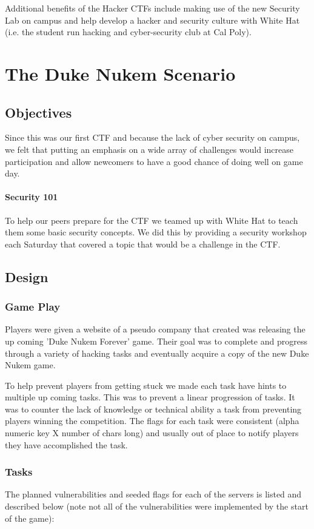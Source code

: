 \documentclass[10pt]{article}
\begin{document}
Additional benefits of the Hacker CTFs include making use of the new Security
Lab on campus and help develop a hacker and security culture with White Hat
(i.e. the student run hacking and cyber-security club at Cal Poly).

\section{The Duke Nukem Scenario}
\subsection{Objectives}
Since this was our first CTF and because the lack of cyber security
on campus, we felt that putting an emphasis on a wide array of challenges
would increase participation and allow newcomers to have a good chance of doing well 
on game day.

\paragraph*{Security 101}To help our peers prepare for the CTF we teamed up with
White Hat to teach them some basic security concepts. We did this by providing a
security workshop each Saturday that covered a topic that would be a challenge
in the CTF.

\subsection{Design}
\subsubsection{Game Play}
Players were given a website of a pseudo company that created was releasing the up coming
'Duke Nukem Forever' game. Their goal was to complete and progress through a variety of 
hacking tasks and eventually acquire a copy of the new Duke Nukem game.

To help prevent players from getting stuck we made each task have hints to multiple
up coming tasks. This was to prevent a linear progression of tasks. It was to counter
the lack of knowledge or technical ability a task from preventing players winning
the competition. The flags for each task were consistent (alpha numeric key X number
of chars long) and usually out of place to notify players they have accomplished
the task.

\subsubsection{Tasks}
\label{dntasks}
The planned vulnerabilities and seeded flags for each of the servers is listed and
described below (note not all of the vulnerabilities were implemented by the start of
the game):
\end{document}
